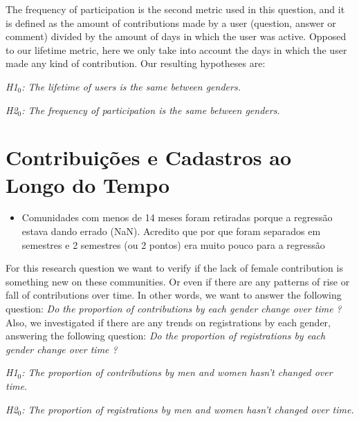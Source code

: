 The frequency of participation is the second metric used in this question, and it is defined as the amount of contributions made by a user (question, answer or comment) divided by the amount of days in which the user was active. Opposed to our lifetime metric, here we only take into account the days in which the user made any kind of contribution. Our resulting hypotheses are:

\textit{H1$_0$: The lifetime of users is the same between genders.}

\textit{H2$_0$: The frequency of participation is the same between genders.}


\section{Contribuições e Cadastros ao Longo do Tempo} %
\label{sub:contribui_es_e_cadastros_ao_longo_do_tempo}

\begin{itemize}
	\item Comunidades com menos de 14 meses foram retiradas porque a regressão estava dando errado (NaN). Acredito que por que foram separados em semestres e 2 semestres (ou 2 pontos) era muito pouco para a regressão
\end{itemize}

For this research question we want to verify if the lack of female contribution is something new on these communities. Or even if there are any patterns of rise or fall of contributions over time. In other words, we want to answer the following question: \textit{Do the proportion of contributions by each gender change over time ?} Also, we investigated if there are any trends on registrations by each gender, answering the following question: \textit{Do the proportion of registrations by each gender change over time ?}

\textit{H1$_0$: The proportion of contributions by men and women hasn't changed over time.}

\textit{H2$_0$: The proportion of registrations by men and women hasn't changed over time.}

